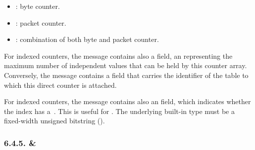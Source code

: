 \documentclass[11pt]{article}
\begin{document}
{\begin{itemize}
\begin{itemize}[noitemsep,topsep=\mdcompacttopsep]
\item{}: byte counter.%

\item{}: packet counter.%

\item{}: combination of both byte and packet counter.%
\end{itemize}%
\end{itemize}%

\noindent{}For indexed counters, the  message contains also a  field, an
 representing the maximum number of independent values that can be held
by this counter array. Conversely, the  message contains a
 field that carries the  identifier of the table to
which this direct counter is attached.%

For indexed counters, the  message contains also an 
field, which indicates whether the index has a~. This is useful for
. The underlying built-in type must
be a fixed-width unsigned bitstring ().%

\subsubsection{6.4.5.\hspace*{0.5em} \& }\label{sec-meter-directmeter}%

}
\end{document}
